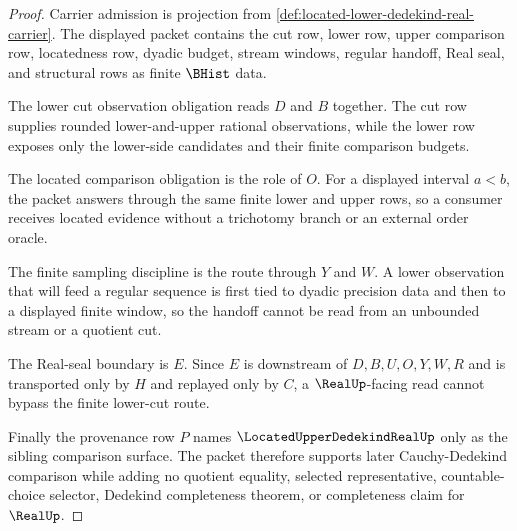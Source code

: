 \begin{proof}
Carrier admission is projection from \autoref{def:located-lower-dedekind-real-carrier}. The displayed packet contains the cut row, lower row, upper comparison row, locatedness row, dyadic budget, stream windows, regular handoff, Real seal, and structural rows as finite $\BHist$ data.

The lower cut observation obligation reads $D$ and $B$ together. The cut row supplies rounded lower-and-upper rational observations, while the lower row exposes only the lower-side candidates and their finite comparison budgets.

The located comparison obligation is the role of $O$. For a displayed interval $a<b$, the packet answers through the same finite lower and upper rows, so a consumer receives located evidence without a trichotomy branch or an external order oracle.

The finite sampling discipline is the route through $Y$ and $W$. A lower observation that will feed a regular sequence is first tied to dyadic precision data and then to a displayed finite window, so the handoff cannot be read from an unbounded stream or a quotient cut.

The Real-seal boundary is $E$. Since $E$ is downstream of $D,B,U,O,Y,W,R$ and is transported only by $H$ and replayed only by $C$, a $\RealUp$-facing read cannot bypass the finite lower-cut route.

Finally the provenance row $P$ names $\LocatedUpperDedekindRealUp$ only as the sibling comparison surface. The packet therefore supports later Cauchy-Dedekind comparison while adding no quotient equality, selected representative, countable-choice selector, Dedekind completeness theorem, or completeness claim for $\RealUp$.
\end{proof}

